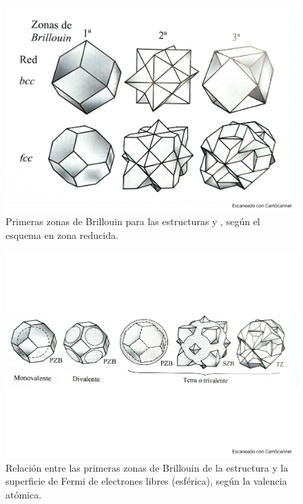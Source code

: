 \begin{figure}[h!] \centering
    \includegraphics[scale=0.5]{Cuerpo/Ch_07/Fotos libro 8.pdf}
    \caption{Primeras zonas de Brillouin para las estructuras \bcc y \fcc, según el esquema en zona reducida.}
    \label{Fig:07-08}
\end{figure}    
\begin{figure}[h!] \centering
    \includegraphics[scale=0.5]{Cuerpo/Ch_07/Fotos libro 9.pdf}
    \caption{Relación entre las primeras zonas de Brillouin de la estructura \fcc y la superficie de Fermi de electrones libres (esférica), según la valencia atómica.}
    \label{Fig:07-09}
\end{figure}    


